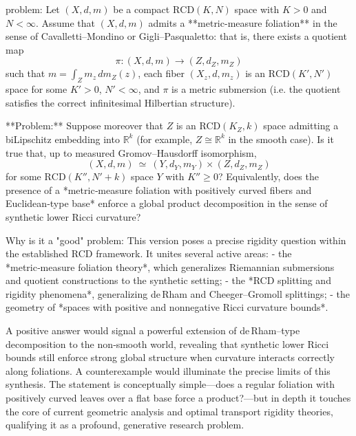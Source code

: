 problem:  
Let \((X,d,m)\) be a compact \(\mathrm{RCD}(K,N)\) space with \(K>0\) and \(N<\infty\).  
Assume that \((X,d,m)\) admits a **metric-measure foliation** in the sense of Cavalletti–Mondino or Gigli–Pasqualetto: that is, there exists a quotient map  
\[
\pi:(X,d,m)\to (Z,d_Z,m_Z)
\]
such that \(m=\int_Z m_z\,dm_Z(z)\), each fiber \((X_z,d,m_z)\) is an \(\mathrm{RCD}(K',N')\) space for some \(K'>0\), \(N'<\infty\), and \(\pi\) is a metric submersion (i.e. the quotient satisfies the correct infinitesimal Hilbertian structure).  

**Problem:**  
Suppose moreover that \(Z\) is an RCD\((K_Z,k)\) space admitting a biLipschitz embedding into \(\mathbb{R}^k\) (for example, \(Z\cong \mathbb{R}^k\) in the smooth case).  
Is it true that, up to measured Gromov–Hausdorff isomorphism,  
\[
(X,d,m)\ \simeq\ (Y,d_Y,m_Y) \times (Z,d_Z,m_Z)
\]
for some \(\mathrm{RCD}(K'',N'+k)\) space \(Y\) with \(K''\ge 0\)?  
Equivalently, does the presence of a *metric‑measure foliation with positively curved fibers and Euclidean‑type base* enforce a global product decomposition in the sense of synthetic lower Ricci curvature?

Why is it a "good" problem:  
This version poses a precise rigidity question within the established RCD framework. It unites several active areas:  
- the *metric‑measure foliation theory*, which generalizes Riemannian submersions and quotient constructions to the synthetic setting;  
- the *RCD splitting and rigidity phenomena*, generalizing de Rham and Cheeger–Gromoll splittings;  
- the geometry of *spaces with positive and nonnegative Ricci curvature bounds*.  

A positive answer would signal a powerful extension of de Rham–type decomposition to the non‑smooth world, revealing that synthetic lower Ricci bounds still enforce strong global structure when curvature interacts correctly along foliations. A counterexample would illuminate the precise limits of this synthesis.  
The statement is conceptually simple—does a regular foliation with positively curved leaves over a flat base force a product?—but in depth it touches the core of current geometric analysis and optimal transport rigidity theories, qualifying it as a profound, generative research problem.